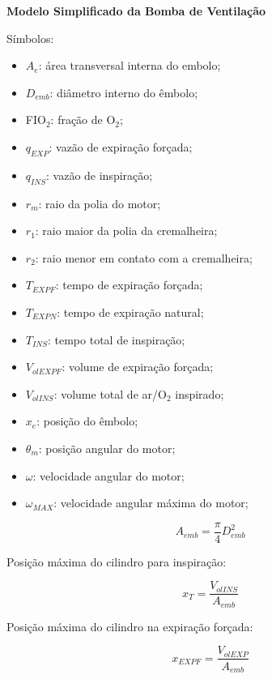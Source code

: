 \documentclass[a4paper,twosides,10pt]{article}
\begin{document}
\textbf{Modelo Simplificado da Bomba de Ventilação}

\vspace{1em}

Símbolos:

\begin{itemize}
\item $A_e$: área transversal interna do embolo;
\item $D_{emb}$: diâmetro interno do êmbolo;
\item FIO$_2$: fração de O$_2$;
\item $q_{EXP}$: vazão de expiração forçada;
\item $q_{INS}$: vazão de inspiração;
\item $r_m$: raio da polia do motor;
\item $r_1$: raio maior da polia da cremalheira;
\item $r_2$: raio menor em contato com a cremalheira;
\item $T_{EXPF}$: tempo de expiração forçada;
\item $T_{EXPN}$: tempo de expiração natural;
\item $T_{INS}$: tempo total de inspiração;
\item $V_{olEXPF}$: volume de expiração forçada;
\item $V_{olINS}$: volume total de ar/O$_2$ inspirado;
\item $x_e$: posição do êmbolo;
\item $\theta_m$: posição angular do motor;
\item $\omega$: velocidade angular do motor;
\item $\omega_{MAX}$: velocidade angular máxima do motor;
\end{itemize}

\begin{equation}
  \label{eq:aemb}
  A_{emb} = \dfrac{\pi}{4}D_{emb}^2
\end{equation}

Posição máxima do cilindro para inspiração:

\begin{equation}
  \label{eq:xt}
  x_T = \dfrac{V_{olINS}}{A_{emb}}
\end{equation}

Posição máxima do cilindro na expiração forçada:

\begin{equation}
  \label{eq:xexp}
  x_{EXPF} = \dfrac{V_{olEXP}}{A_{emb}}
\end{equation}
\end{document}
